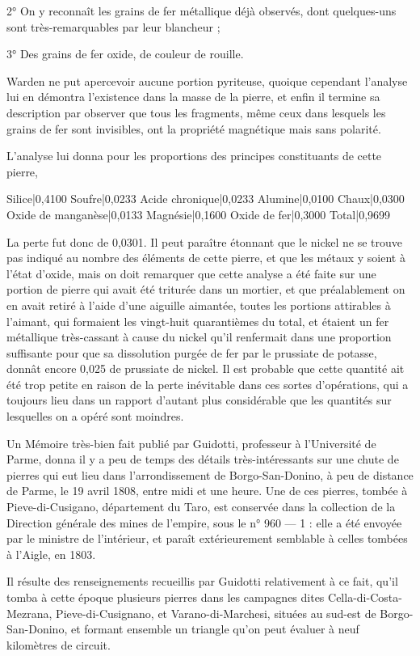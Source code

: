 \documentclass[a4paper, 12pt, oneside, french]{article}
\begin{document}
2° On y reconnaît les grains de fer métallique déjà observés, dont quelques-uns sont très-remarquables par leur blancheur ;

3° Des grains de fer oxide, de couleur de rouille.

Warden ne put apercevoir aucune portion pyriteuse, quoique cependant l'analyse lui en démontra l'existence dans la masse de la pierre, et enfin il termine sa description par observer que tous les fragments, même ceux dans lesquels les grains de fer sont invisibles, ont la propriété magnétique mais sans polarité.

L'analyse lui donna pour les proportions des principes constituants de cette pierre,

Silice|0,4100  
Soufre|0,0233  
Acide chronique|0,0233  
Alumine|0,0100  
Chaux|0,0300  
Oxide de manganèse|0,0133  
Magnésie|0,1600  
Oxide de fer|0,3000  
Total|0,9699

La perte fut donc de 0,0301. Il peut paraître étonnant que le nickel ne se trouve pas indiqué au nombre des éléments de cette pierre, et que les métaux y soient à l'état d'oxide, mais on doit remarquer que cette analyse a été faite sur une portion de pierre qui avait été triturée dans un mortier, et que préalablement on en avait retiré à l'aide d'une aiguille aimantée, toutes les portions attirables à l'aimant, qui formaient les vingt-huit quarantièmes du total, et étaient un fer métallique très-cassant à cause du nickel qu'il renfermait dans une proportion suffisante pour que sa dissolution purgée de fer par le prussiate de potasse, donnât encore 0,025 de prussiate de nickel. Il est probable que cette quantité ait été trop petite en raison de la perte inévitable dans ces sortes d'opérations, qui a toujours lieu dans un rapport d'autant plus considérable que les quantités sur lesquelles on a opéré sont moindres.

Un Mémoire très-bien fait publié par Guidotti, professeur à l'Université de Parme, donna il y a peu de temps des détails très-intéressants sur une chute de pierres qui eut lieu dans l'arrondissement de Borgo-San-Donino, à peu de distance de Parme, le 19 avril 1808, entre midi et une heure. Une de ces pierres, tombée à Pieve-di-Cusigano, département du Taro, est conservée dans la collection de la Direction générale des mines de l'empire, sous le n° 960 --- 1 : elle a été envoyée par le ministre de l'intérieur, et paraît extérieurement semblable à celles tombées à l'Aigle, en 1803.

Il résulte des renseignements recueillis par Guidotti relativement à ce fait, qu'il tomba à cette époque plusieurs pierres dans les campagnes dites Cella-di-Costa-Mezrana, Pieve-di-Cusignano, et Varano-di-Marchesi, situées au sud-est de Borgo-San-Donino, et formant ensemble un triangle qu'on peut évaluer à neuf kilomètres de circuit.
\end{document}
